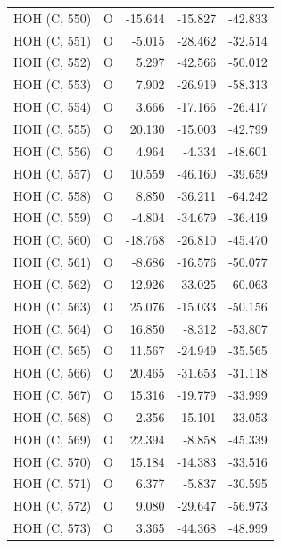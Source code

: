 \begin{longtable}{@{}lcrr@{}}
  \cmidrule(r){1-5}
  HOH (C, 550) & O & -15.644 & -15.827 & -42.833 \\
  \cmidrule(r){1-5}
  HOH (C, 551) & O & -5.015 & -28.462 & -32.514 \\
  \cmidrule(r){1-5}
  HOH (C, 552) & O & 5.297 & -42.566 & -50.012 \\
  \cmidrule(r){1-5}
  HOH (C, 553) & O & 7.902 & -26.919 & -58.313 \\
  \cmidrule(r){1-5}
  HOH (C, 554) & O & 3.666 & -17.166 & -26.417 \\
  \cmidrule(r){1-5}
  HOH (C, 555) & O & 20.130 & -15.003 & -42.799 \\
  \cmidrule(r){1-5}
  HOH (C, 556) & O & 4.964 & -4.334 & -48.601 \\
  \cmidrule(r){1-5}
  HOH (C, 557) & O & 10.559 & -46.160 & -39.659 \\
  \cmidrule(r){1-5}
  HOH (C, 558) & O & 8.850 & -36.211 & -64.242 \\
  \cmidrule(r){1-5}
  HOH (C, 559) & O & -4.804 & -34.679 & -36.419 \\
  \cmidrule(r){1-5}
  HOH (C, 560) & O & -18.768 & -26.810 & -45.470 \\
  \cmidrule(r){1-5}
  HOH (C, 561) & O & -8.686 & -16.576 & -50.077 \\
  \cmidrule(r){1-5}
  HOH (C, 562) & O & -12.926 & -33.025 & -60.063 \\
  \cmidrule(r){1-5}
  HOH (C, 563) & O & 25.076 & -15.033 & -50.156 \\
  \cmidrule(r){1-5}
  HOH (C, 564) & O & 16.850 & -8.312 & -53.807 \\
  \cmidrule(r){1-5}
  HOH (C, 565) & O & 11.567 & -24.949 & -35.565 \\
  \cmidrule(r){1-5}
  HOH (C, 566) & O & 20.465 & -31.653 & -31.118 \\
  \cmidrule(r){1-5}
  HOH (C, 567) & O & 15.316 & -19.779 & -33.999 \\
  \cmidrule(r){1-5}
  HOH (C, 568) & O & -2.356 & -15.101 & -33.053 \\
  \cmidrule(r){1-5}
  HOH (C, 569) & O & 22.394 & -8.858 & -45.339 \\
  \cmidrule(r){1-5}
  HOH (C, 570) & O & 15.184 & -14.383 & -33.516 \\
  \cmidrule(r){1-5}
  HOH (C, 571) & O & 6.377 & -5.837 & -30.595 \\
  \cmidrule(r){1-5}
  HOH (C, 572) & O & 9.080 & -29.647 & -56.973 \\
  \cmidrule(r){1-5}
  HOH (C, 573) & O & 3.365 & -44.368 & -48.999 \\

\end{longtable}
